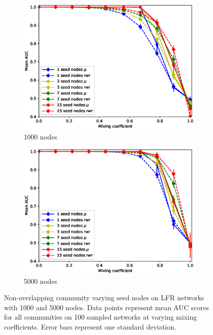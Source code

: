 \documentclass[sigconf]{acmart}
\begin{document}
\begin{figure}[t]
    \centering
    \begin{subfigure}[b]{0.45\textwidth}
        \centering
        \includegraphics[width=\textwidth]{images/lfr_binary_mo_overlap_auc_1000.eps}
        \caption{1000 nodes}
    \end{subfigure}
    \begin{subfigure}[b]{0.45\textwidth}
        \centering
        \includegraphics[width=\textwidth]{images/lfr_binary_mo_overlap_auc_5000.eps}
        \caption{5000 nodes}
    \end{subfigure}
    \caption{Non-overlapping community varying seed nodes on LFR networks with 1000 and 5000 nodes.
     Data points represent mean AUC scores for all communities on 100 sampled networks at varying mixing coefficients.
     Error bars represent one standard deviation.}
     \label{fig:auc_no_overlap}
\end{figure}
\end{document}
